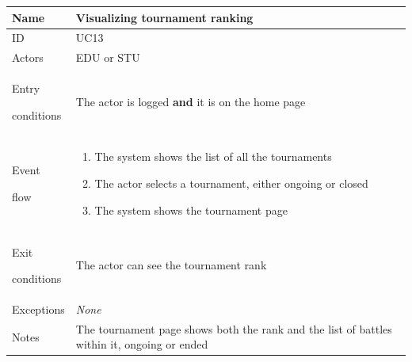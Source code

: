 \begin{center}
    \def\arraystretch{1.5}
    \begin{tabular}{| m{2cm} | m{10cm}|}
        \hline
        Name                  & Visualizing tournament ranking                                                              \\ \hline
        ID                    & UC13                                                                                        \\ \hline
        Actors                & EDU or STU                                                                                  \\ \hline
        Entry \par conditions & The actor is logged \textbf{and} it is on the home page                                     \\ \hline
        Event \par flow       & \begin{enumerate}
                                    \item The system shows the list of all the tournaments
                                    \item The actor selects a tournament, either ongoing or closed
                                    \item The system shows the tournament page
                                \end{enumerate}                               \\ \hline
        Exit \par conditions  & The actor can see the tournament rank                                                       \\ \hline
        Exceptions            & \textit{None}                                                                               \\ \hline
        Notes                 & The tournament page shows both the rank and the list of battles within it, ongoing or ended \\ \hline
    \end{tabular}
\end{center}
